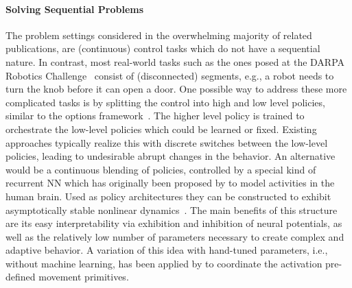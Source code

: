 \documentclass[utf8]{frontiersSCNS} %
\begin{document}
\paragraph*{Solving Sequential Problems}
The problem settings considered in the overwhelming majority of related publications, are (continuous) control tasks which do not have a sequential nature.
In contrast, most real-world tasks such as the ones posed at the DARPA Robotics Challenge~\citep{Krotkov_Orlowski_17} consist of (disconnected) segments, e.g., a robot needs to turn the knob before it can open a door.
One possible way to address these more complicated tasks is by splitting the control into high and low level policies, similar to the options framework~\citep{Sutton_Singh_99}.
The higher level policy is trained to orchestrate the low-level policies which could be learned or fixed.
Existing approaches typically realize this with discrete switches between the low-level policies, leading to undesirable abrupt changes in the behavior.
An alternative would be a continuous blending of policies, controlled by a special kind of recurrent \ac{NN} which has originally been proposed by \citet{Amari_77} to model activities in the human brain.
Used as policy architectures they can be constructed to exhibit asymptotically stable nonlinear dynamics~\citep{Kishimoto_Amari_79}.
The main benefits of this structure are its easy interpretability via exhibition and inhibition of neural potentials, as well as the relatively low number of parameters necessary to create complex and adaptive behavior.
A variation of this idea with hand-tuned parameters, i.e., without machine learning, has been applied by \citet{Luksch_Yoshiike_12} to coordinate the activation pre-defined movement primitives.

\end{document}
